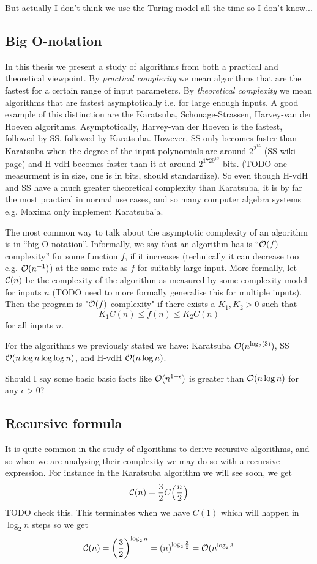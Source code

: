 But actually I don't think we use the Turing model all the time so I don't know...

\subsection{Big O-notation}%
\label{sub:Big O-notation}

In this thesis we present a study of algorithms from both a practical and theoretical viewpoint. By \textit{practical complexity} we mean algorithms that are the fastest for a certain range of input parameters. By \textit{theoretical complexity} we mean algorithms that are fastest asymptotically i.e. for large enough inputs. A good example of this distinction are the  Karatsuba, Schonage-Strassen, Harvey-van der Hoeven algorithms. Asymptotically, Harvey-van der Hoeven is the fastest, followed by SS, followed by Karatsuba. However, SS only becomes faster than Karatsuba when the degree of the input polynomials are around $2^{2^{15}}$ (SS wiki page) and H-vdH becomes faster than it at around $2^{1729^{12}}$ bits. (TODO one measurment is in size, one is in bits, should standardize). So even though H-vdH and SS have a much greater theoretical complexity than Karatsuba, it is by far the most practical in normal use cases, and so many computer algebra systems e.g. Maxima only implement Karatsuba'a.

The most common way to talk about the asymptotic complexity of an algorithm is in ``big-O notation''. Informally, we say that an algorithm has is ``$\mathcal O(f)$ complexity'' for some function $f$, if it increases (technically it can decrease too e.g. $\mathcal O(n^{-1})$) at the same rate as $f$ for suitably large input. 
More formally, let $\mathcal C(n)$ be the complexity of the algorithm as measured by some complexity model for inputs $n$ (TODO need to more formally generalise this for multiple inputs). Then the program is "$\mathcal O(f)$ complexity" if there exists a $K_1, K_2 > 0$ such that 
\[
    K_1C(n) \leq f(n) \leq K_2C(n)
\]
for all inputs $n$.

For the algorithms we previously stated we have: Karatsuba $\mathcal O(n^{\log_2(3)})$, SS $\mathcal O(n\log n \log \log n)$, and H-vdH $\mathcal O(n \log n)$.

Should I say some basic basic facts like $\mathcal O(n^{1 + \epsilon})$ is greater than $\mathcal O(n\log n)$ for any $\epsilon > 0$?

\subsection{Recursive formula}%
\label{sub:Recursive forumla}

It is quite common in the study of algorithms to derive recursive algorithms, and so when we are analysing their complexity we may do so with a recursive expression. For instance in the Karatsuba algorithm we will see soon, we get
\[
    \M{C}(n) = \frac{3}{2}C\bb{\frac{n}{2}}
\]
TODO check this.
This terminates when we have $C(1)$ which will happen in $\log_2 n$ steps so we get
\[
    \M{C}(n) = \bb{\frac{3}{2}}^{\log_2 n} = \bb{n}^{\log_2 \frac{3}{2}} = \M{O}(n^{\log_2 3}
\]
